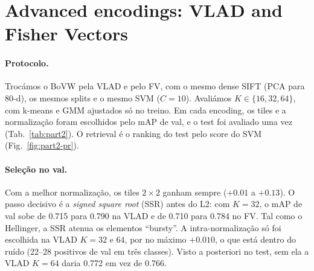 \section{Advanced encodings: VLAD and Fisher Vectors}
\label{sec:part2}

\paragraph{Protocolo.}
Trocámos o BoVW pela VLAD e pelo FV, com o mesmo dense SIFT (PCA para 80-d),
os mesmos splits e o mesmo SVM ($C=10$). Avaliámos $K\in\{16,32,64\}$, com
k-means e GMM ajustados só no treino. Em cada encoding, os tiles e a
normalização foram escolhidos pelo mAP de val, e o test foi avaliado uma vez
(Tab.~\ref{tab:part2}). O retrieval é o ranking do test pelo score do SVM
(Fig.~\ref{fig:part2-pr}).

\paragraph{Seleção no val.}
Com a melhor normalização, os tiles $2\times2$ ganham sempre ($+0.01$ a
$+0.13$). O passo decisivo é a
\emph{signed square root} (SSR) antes do L2: com $K=32$, o mAP de val sobe de
0.715 para 0.790 na VLAD e de 0.710 para 0.784 no FV. Tal como o Hellinger, a
SSR atenua os elementos ``bursty''. A intra-normalização só foi escolhida na
VLAD $K=32$ e $64$, por no máximo $+0.010$, o que está dentro do ruído (22--28
positivos de val em três classes). Visto a posteriori no test, sem ela a VLAD
$K=64$ daria 0.772 em vez de 0.766.

\begin{table}[t]
\centering
\caption{AP de test e custos da configuração escolhida. Extr.\ = SIFT
(152\,ms) + encoding, por imagem, em CPU (5 imagens). KB = $d\times4$\,B.
Inf.\ = normalização + SVM, por imagem de test.}
\label{tab:part2}
\small
{}
\end{table}

